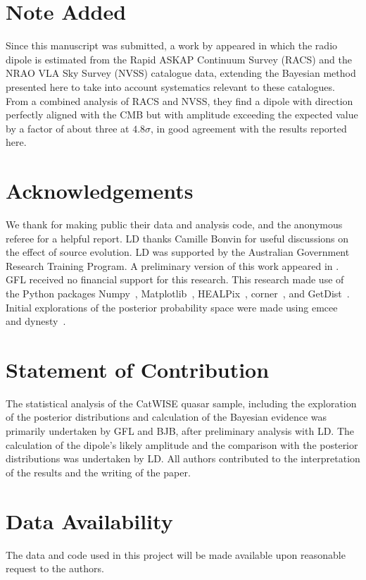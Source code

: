 \documentclass[fleqn,usenatbib]{mnras}
\def\healpix{{\sc HEALPix}}
\begin{document}
\section*{Note Added}
Since this manuscript was submitted, a work by \citet*{2023A&A...675A..72W} appeared in which
the radio dipole is estimated from the Rapid ASKAP Continuum Survey (RACS) and the
NRAO VLA Sky Survey (NVSS) catalogue data, extending the Bayesian method
presented here to take into account systematics relevant to these catalogues.
From a combined analysis of RACS and NVSS, they find a dipole with direction
perfectly aligned with the CMB but with amplitude exceeding the expected value
by a factor of about three at $4.8\sigma$, in good agreement with the
results reported here.

\section*{Acknowledgements}
We thank \citet{2021ApJ...908L..51S}
for making public their data and analysis code, and the
anonymous referee for a helpful report.
LD thanks Camille Bonvin for useful discussions on
the effect of source evolution.
LD was supported by the Australian Government Research Training Program.
A preliminary version of this work appeared in
\cite{2123-27817}.
GFL received no financial support for this research.
This research made use of the Python packages
{\sc Numpy}~\citep{numpy},
{\sc Matplotlib}~\citep{matplotlib},
\healpix~\citep{2005ApJ...622..759G,Zonca2019},
{\sc corner}~\citep{corner},
and \mbox{\sc GetDist}~\citep{GetDist}.
Initial explorations of the posterior probability space were made using
{\sc emcee}~\citep{ForemanMackey:2012ig} and
{\sc dynesty}~\citep{2004AIPC..735..395S,10.1214/06-BA127,cite-key,2020MNRAS.493.3132S}.

\section*{Statement of Contribution}
The statistical analysis of the CatWISE quasar sample, including the exploration
of the posterior distributions and calculation of the Bayesian evidence was primarily 
undertaken by GFL and BJB, after preliminary analysis with LD. The calculation
of the dipole's likely amplitude and the comparison with the
posterior distributions was undertaken by LD. All authors contributed to the interpretation of the results and 
the writing of the paper.

\section*{Data Availability}
The data and code used in this project will be made available upon reasonable request to the authors. 





\appendix


\bsp	%
\label{lastpage}
\end{document}
